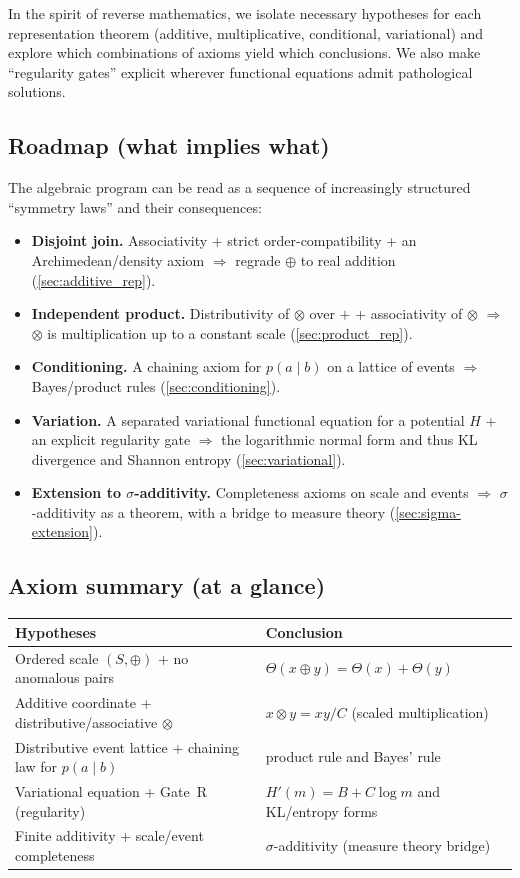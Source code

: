 \documentclass[11pt]{article}
\theoremstyle{definition}
\theoremstyle{remark}
\begin{document}
In the spirit of reverse mathematics, we isolate necessary hypotheses for each representation theorem
(additive, multiplicative, conditional, variational) and explore which combinations of axioms yield
which conclusions. We also make ``regularity gates'' explicit wherever functional equations admit
pathological solutions.

\subsection*{Roadmap (what implies what)}

The algebraic program can be read as a sequence of increasingly structured ``symmetry laws'' and their
consequences:
\begin{itemize}
\item \textbf{Disjoint join.} Associativity + strict order-compatibility + an Archimedean/density axiom
  $\Rightarrow$ regrade $\oplus$ to real addition (\cref{sec:additive_rep}).
\item \textbf{Independent product.} Distributivity of $\otimes$ over $+$ + associativity of $\otimes$
  $\Rightarrow$ $\otimes$ is multiplication up to a constant scale (\cref{sec:product_rep}).
\item \textbf{Conditioning.} A chaining axiom for $p(a\mid b)$ on a lattice of events
  $\Rightarrow$ Bayes/product rules (\cref{sec:conditioning}).
\item \textbf{Variation.} A separated variational functional equation for a potential $H$
  + an explicit regularity gate $\Rightarrow$ the logarithmic normal form and thus KL divergence and
  Shannon entropy (\cref{sec:variational}).
\item \textbf{Extension to $\sigma$-additivity.} Completeness axioms on scale and events
  $\Rightarrow$ $\sigma$-additivity as a theorem, with a bridge to measure theory (\cref{sec:sigma-extension}).
\end{itemize}

\subsection*{Axiom summary (at a glance)}

\begin{center}
\begin{tabular}{|l|l|}
\hline
\textbf{Hypotheses} & \textbf{Conclusion} \\
\hline
Ordered scale $(S,\oplus)$ + no anomalous pairs & $\Theta(x\oplus y)=\Theta(x)+\Theta(y)$ \\
\hline
Additive coordinate + distributive/associative $\otimes$ & $x\otimes y = xy/C$ (scaled multiplication) \\
\hline
Distributive event lattice + chaining law for $p(a\mid b)$ & product rule and Bayes' rule \\
\hline
Variational equation + Gate~R (regularity) & $H'(m)=B+C\log m$ and KL/entropy forms \\
\hline
Finite additivity + scale/event completeness & $\sigma$-additivity (measure theory bridge) \\
\hline
\end{tabular}
\end{center}
\end{document}
